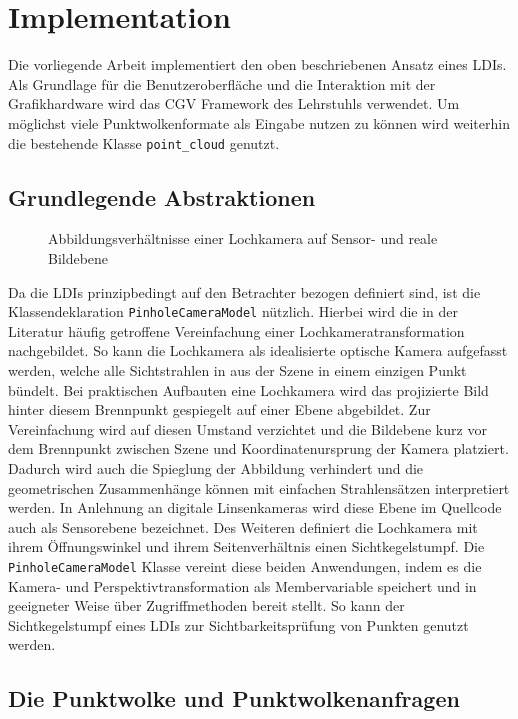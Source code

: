 \documentclass[hyperref, beleg, german]{cgvpub}
\begin{document}
\chapter{Implementation}

Die vorliegende Arbeit implementiert den oben beschriebenen Ansatz eines LDIs.
Als Grundlage für die Benutzeroberfläche und die Interaktion mit der
Grafikhardware wird das CGV Framework des Lehrstuhls verwendet. Um möglichst
viele Punktwolkenformate als Eingabe nutzen zu können wird weiterhin die
bestehende Klasse \texttt{point\_cloud} genutzt.

\section{Grundlegende Abstraktionen}

\begin{figure}
	\centering
	
	\caption{Abbildungsverhältnisse einer Lochkamera auf Sensor- und reale 
	Bildebene}%
	\label{fig:pinholecamera}
\end{figure}

Da die LDIs prinzipbedingt auf den Betrachter bezogen definiert sind, ist die
Klassendeklaration \texttt{PinholeCameraModel} nützlich. Hierbei wird die in
der Literatur häufig getroffene Vereinfachung einer Lochkameratransformation
nachgebildet. So kann die Lochkamera als idealisierte optische Kamera
aufgefasst werden, welche alle Sichtstrahlen in aus der Szene in einem einzigen
Punkt bündelt. Bei praktischen Aufbauten eine Lochkamera wird das projizierte
Bild hinter diesem Brennpunkt gespiegelt auf einer Ebene abgebildet. Zur
Vereinfachung wird auf diesen Umstand verzichtet und die Bildebene kurz vor dem
Brennpunkt zwischen Szene und Koordinatenursprung der Kamera platziert. Dadurch
wird auch die Spieglung der Abbildung verhindert und die geometrischen
Zusammenhänge können mit einfachen Strahlensätzen interpretiert werden. In
Anlehnung an digitale Linsenkameras wird diese Ebene im Quellcode auch als
Sensorebene bezeichnet. Des Weiteren definiert die Lochkamera mit ihrem
Öffnungswinkel und ihrem Seitenverhältnis einen Sichtkegelstumpf. Die
\texttt{PinholeCameraModel} Klasse vereint diese beiden Anwendungen, indem es
die Kamera- und Perspektivtransformation als Membervariable speichert und in
geeigneter Weise über Zugriffmethoden bereit stellt. So kann der
Sichtkegelstumpf eines LDIs zur Sichtbarkeitsprüfung von Punkten genutzt
werden.

\section{Die Punktwolke und Punktwolkenanfragen}
\end{document}
